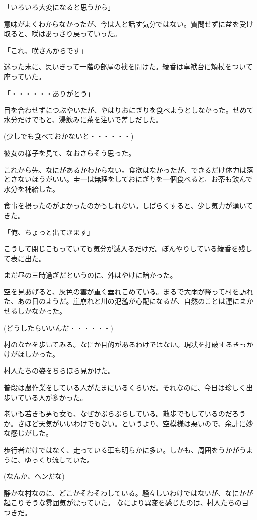 ﻿\documentclass[book,tate]{jlreq}
\begin{document}
「いろいろ大変になると思うから」

意味がよくわからなかったが、今は人と話す気分ではない。質問せずに盆を受け取ると、咲はあっさり戻っていった。

「これ、咲さんからです」

迷った末に、思いきって一階の部屋の襖を開けた。綾香は卓袱台に頬杖をついて座っていた。

「・・・・・・ありがとう」

目を合わせずにつぶやいたが、やはりおにぎりを食べようとしなかった。せめて水分だけでもと、湯飲みに茶を注いで差しだした。

(少しでも食べておかないと・・・・・・)

彼女の様子を見て、なおさらそう思った。

これから先、なにがあるかわからない。食欲はなかったが、できるだけ体力は落とさないほうがいい。圭一は無理をしておにぎりを一個食べると、お茶も飲んで水分を補給した。

食事を摂ったのがよかったのかもしれない。しばらくすると、少し気力が湧いてきた。

「俺、ちょっと出てきます」

こうして閉じこもっていても気分が滅入るだけだ。ぼんやりしている綾香を残して表に出た。

まだ昼の三時過ぎだというのに、外はやけに暗かった。

空を見あげると、灰色の雲が重く垂れこめている。まるで大雨が降って村を訪れた、あの日のようだ。崖崩れと川の氾濫が心配になるが、自然のことは運にまかせるしかなかった。

(どうしたらいいんだ・・・・・・)

村のなかを歩いてみる。なにか目的があるわけではない。現状を打破するきっかけがほしかった。

村人たちの姿をちらほら見かけた。

普段は農作業をしている人がたまにいるくらいだ。それなのに、今日は珍しく出歩いている人が多かった。

老いも若きも男も女も、なぜかぶらぶらしている。散歩でもしているのだろうか。さほど天気がいいわけでもない。というより、空模様は悪いので、余計に妙な感じがした。

歩行者だけではなく、走っている車も明らかに多い。しかも、周囲をうかがうように、ゆっくり流していた。

(なんか、ヘンだな)

静かな村なのに、どこかそわそわしている。騒々しいわけではないが、なにかが起こりそうな雰囲気が漂っていた。 なにより異変を感じたのは、村人たちの目つきだ。
\end{document}
